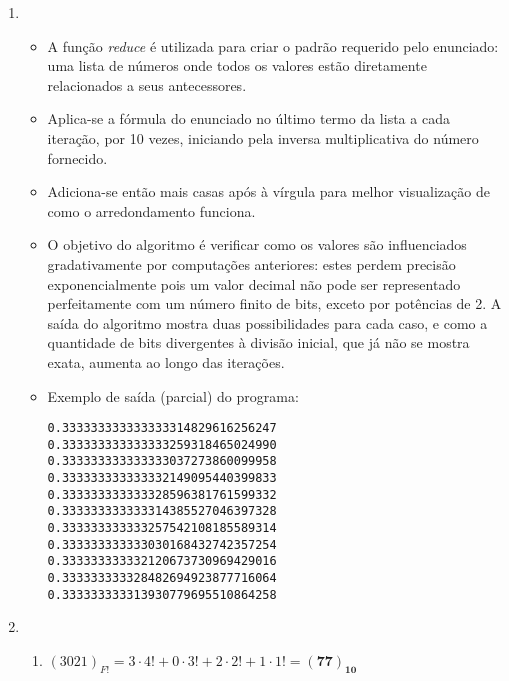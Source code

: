 \documentclass{article}
\newenvironment{arabenum}{
    \begin{enumerate}[label=\textbf{\arabic*})]
}{
    \end{enumerate}
}
\newenvironment{alphenum}{
    \begin{enumerate}[label=(\alph*)]
}{
    \end{enumerate}
}
\newenvironment{discusscode}[1]{
    
    \vspace{-2mm}
    \begin{itemize}
}{
    \end{itemize}
}
\begin{document}
\begin{arabenum}
\begin{alphenum}
Logo, $(10.57)_{10} = \boldsymbol{(1010.10010001111010 \dots)_2}$.

\end{alphenum}

\item \begin{discusscode}{round.py}

\item A função \emph{reduce} é utilizada para criar o padrão requerido pelo
enunciado: uma lista de números onde todos os valores estão diretamente
relacionados a seus antecessores.

\item Aplica-se a fórmula do enunciado no último termo da lista a cada iteração,
por 10 vezes, iniciando pela inversa multiplicativa do número fornecido.

\item Adiciona-se então mais casas após à vírgula para melhor visualização de
como o arredondamento funciona.

\item O objetivo do algoritmo é verificar como os valores são influenciados
gradativamente por computações anteriores: estes perdem precisão
exponencialmente pois um valor decimal não pode ser representado perfeitamente
com um número finito de bits, exceto por potências de 2. A saída do algoritmo
mostra duas possibilidades para cada caso, e como a quantidade de bits
divergentes à divisão inicial, que já não se mostra exata, aumenta ao longo das
iterações.

\item Exemplo de saída (parcial) do programa:

\begin{verbatim}
0.333333333333333314829616256247
0.333333333333333259318465024990
0.333333333333333037273860099958
0.333333333333332149095440399833
0.333333333333328596381761599332
0.333333333333314385527046397328
0.333333333333257542108185589314
0.333333333333030168432742357254
0.333333333332120673730969429016
0.333333333328482694923877716064
0.333333333313930779695510864258
\end{verbatim}

\end{discusscode}

\item \begin{alphenum}

\item $(3021)_{F!} = 3 \cdot 4! + 0 \cdot 3! + 2 \cdot 2! + 1 \cdot 1! =
\boldsymbol{(77)_{10}}$


\end{alphenum}
\end{arabenum}
\end{document}
